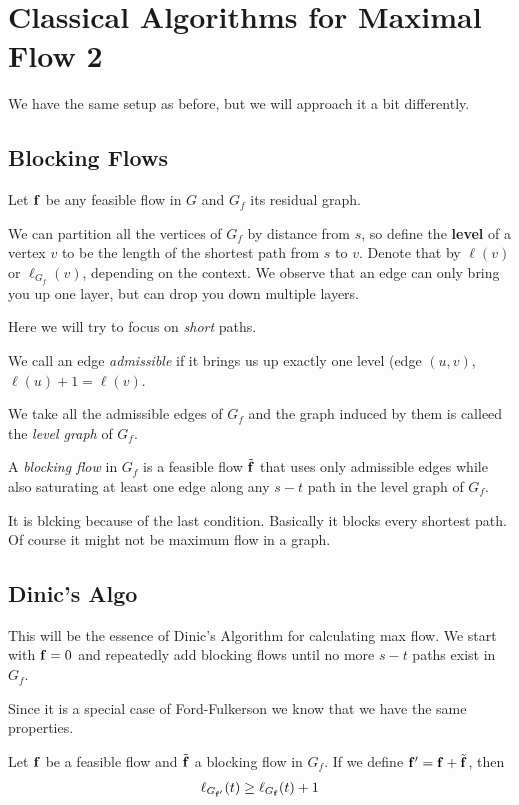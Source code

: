 \section{Classical Algorithms for Maximal Flow 2}
We have the same setup as before, but we will approach it a bit differently.

\subsection{Blocking Flows}

Let $\mathbf{f}$ be any feasible flow in $G$ and $G_f$ its residual graph. 

We can partition all the vertices of $G_f$ by distance from $s$, so define the \textbf{level} of a vertex $v$ to be the length of the shortest path from $s$ to $v$. Denote that by $\ell (v)$ or $\ell_{G_f} (v)$, depending on the context. We observe that an edge can only bring you up one layer, but can drop you down multiple layers.

Here we will try to focus on \textit{short} paths. 

\begin{definicija}
    We call an edge \emph{admissible} if it brings us up exactly one level (edge $(u,v)$, $\ell(u) + 1 = \ell(v)$.

    We take all the admissible edges of $G_f$ and the graph induced by them is calleed the \emph{level graph} of $G_f$.

    A \emph{blocking flow} in $G_f$ is a feasible flow $\Tilde{\mathbf{f}}$ that uses only admissible edges while also saturating at least one edge along any $s-t$ path in the level graph of $G_f$.
    
\end{definicija}

It is blcking because of the last condition. Basically it blocks every shortest path. Of course it might not be maximum flow in a graph.


\subsection{Dinic's Algo}

This will be the essence of Dinic's Algorithm for calculating max flow. We start with $\mathbf{f} = 0$ and repeatedly add blocking flows until no more $s-t$ paths exist in $G_f$.

Since it is a special case of Ford-Fulkerson we know that we have the same properties.

\begin{lema}
    Let $\mathbf{f}$ be a feasible flow and $\Tilde{\mathbf{f}}$ a blocking flow in $G_f$. If we define $\mathbf{f} ' = \mathbf{f} + \Tilde{\mathbf{f}}$, then 
    \begin{align*}
        \ell_{G_{\mathbf{f}'}}(t) \geq \ell_{G_{\mathbf{f}}}(t) +1
    \end{align*}
\end{lema}

